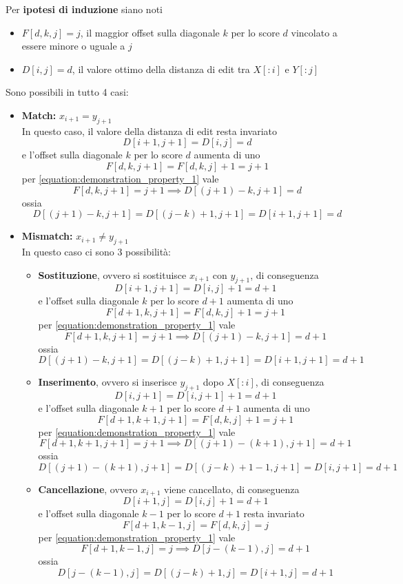     Per \textbf{ipotesi di induzione} siano noti
    \begin{itemize}
        \item $F[d, k, j] = j$, il maggior offset sulla diagonale $k$ per lo score $d$ vincolato a essere minore o uguale a $j$
        
        \item $D[i, j] = d$, il valore ottimo della distanza di edit tra $X[:i]$ e $Y[:j]$
    \end{itemize}
    Sono possibili in tutto 4 casi:
    \begin{itemize}
        \item \textbf{Match: } $x_{i+1} = y_{j+1}$ \\
        In questo caso, il valore della distanza di edit resta invariato 
        $$D[i+1, j+1] = D[i,j] = d$$
        e l'offset sulla diagonale $k$ per lo score $d$ aumenta di uno
        $$F[d, k, j + 1] = F[d, k, j] + 1 = j + 1$$
        per \ref{equation:demonstration_property_1} vale
        $$F[d,k,j+1] = j + 1 \implies D[(j+1) - k, j+1] = d$$
        ossia
        $$D[(j+1)-k, j+1] = D[(j-k)+1, j+1] = D[i+1, j+1] = d$$
        
        \item \textbf{Mismatch: } $x_{i+1} \neq y_{j+1}$ \\ 
        In questo caso ci sono 3 possibilità:
    
        \begin{itemize}
            \item \textbf{Sostituzione}, ovvero si sostituisce $x_{i+1}$ con $y_{j+1}$, di conseguenza
            $$D[i+1, j+1] = D[i,j] + 1 = d + 1$$
            e l'offset sulla diagonale $k$ per lo score $d+1$ aumenta di uno
            $$F[d+1,k,j+1] = F[d,k,j] + 1 = j + 1$$
            per \ref{equation:demonstration_property_1} vale
            $$F[d+1,k,j+1] = j + 1 \implies D[(j+1)-k, j+1] = d + 1$$
            ossia
            $$D[(j+1)-k, j+1] = D[(j-k)+1, j+1] = D[i+1, j+1] = d + 1$$
    
            \item \textbf{Inserimento}, ovvero si inserisce $y_{j+1}$ dopo $X[:i]$, di conseguenza
            $$D[i,j+1] = D[i,j+1] + 1 = d + 1$$
             e l'offset sulla diagonale $k + 1$ per lo score $d+1$ aumenta di uno
            $$F[d+1,k+1,j+1] = F[d,k,j] + 1 = j + 1$$
            per \ref{equation:demonstration_property_1} vale
            $$F[d+1,k+1,j+1] = j + 1 \implies D[(j+1)-(k+1), j+1] = d + 1$$
            ossia
            $$D[(j+1)-(k+1), j+1] = D[(j-k)+1-1, j+1] = D[i, j+1] = d + 1$$
    
            \item \textbf{Cancellazione}, ovvero $x_{i+1}$ viene cancellato, di conseguenza
            $$D[i+1, j] = D[i,j] + 1 = d + 1$$
            e l'offset sulla diagonale $k - 1$ per lo score $d+1$ resta invariato
            $$F[d+1,k-1,j] = F[d,k,j] = j$$
            per \ref{equation:demonstration_property_1} vale
            $$F[d+1,k-1,j] = j \implies D[j-(k-1), j] = d + 1$$
            ossia
            $$D[j-(k-1), j] = D[(j-k)+1, j] = D[i+1, j] = d + 1$$
        \end{itemize}
    \end{itemize}

